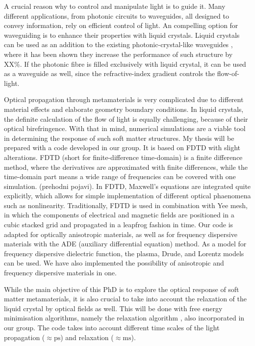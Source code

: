 \documentclass[a4paper,11pt]{article}
\begin{document}
A crucial reason why to control and manipulate light is to guide it. 
Many different applications, from photonic circuits to waveguides, all designed to convey information, rely on efficient control of light. 
An compelling option for waveguiding is to enhance their properties with liquid crystals. 
Liquid crystals can be used as an addition to the existing photonic-crystal-like waveguides \cite{dd}, where it has been shown they increase the performance of such structure by XX\%. 
If the photonic fibre is filled exclusively with liquid crystal, it can be used as a waveguide as well, since the refractive-index gradient controls the flow-of-light. 


Optical propagation through metamaterials is very complicated due to different material effects and elaborate geometry boundary conditions. 
In liquid crystals, the definite calculation of the flow of light is equally challenging, because of their optical birefringence. 
With that in mind, numerical simulations are a viable tool in determining the response of such soft matter structures. 
My thesis will be prepared with a code developed in our group. 
It is based on FDTD with slight alterations. 
FDTD (short for finite-difference time-domain) is a finite difference method, where the derivatives are approximated with finite differences, while the time-domain part means a wide range of frequencies can be covered with one simulation. (prehodni pojavi). 
In FDTD, Maxwell's equations are integrated quite explicitly, which allows for simple implementation of different optical phaenomena such as nonlinearity. 
Traditionally, FDTD is used in combination with Yee mesh, in which the components of electrical and magnetic fields are positioned in a cubic stacked grid and propagated in a leapfrog fashion in time. 
Our code is adapted for optically anisotropic materials, as well as for frequency dispersive materials with the ADE (auxiliary differential equation) method. 
As a model for frequency dispersive dielectric function, the plasma, Drude, and Lorentz models can be used. 
We have also implemented the possibility of anisotropic and frequency dispersive materials in one. 

While the main objective of this PhD is to explore the optical response of soft matter metamaterials, it is also crucial to take into account the relaxation of the liquid crystal by optical fields as well. 
This will be done with free energy minimisation algorithms, namely the relaxation algorithm \cite{ravnik}, also incorporated in our group. 
The code takes into account different time scales of the light propagation ($\approx \mathrm{ps}$) and relaxation ($\approx \mathrm{ms}$). 
\end{document}
